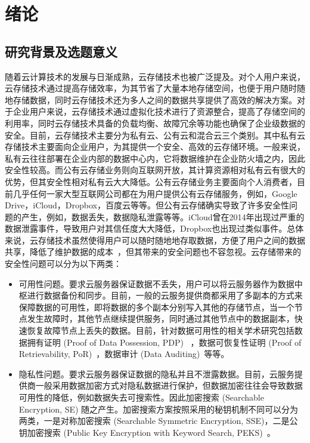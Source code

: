 \chapter{绪论}
\label{cha:intro}
\section{研究背景及选题意义}
随着云计算技术的发展与日渐成熟，云存储技术也被广泛提及。对个人用户来说，云存储技术通过提高存储效率，为其节省了大量本地存储空间，也便于用户随时随地存储数据，同时云存储技术还为多人之间的数据共享提供了高效的解决方案。对于企业用户来说，云存储技术通过虚拟化技术进行了资源整合，提高了存储空间的利用率，同时云存储技术具备的负载均衡、故障冗余等功能也确保了企业级数据的安全。目前，云存储技术主要分为私有云、公有云和混合云三个类别。其中私有云存储技术主要面向企业用户，为其提供一个安全、高效的云存储环境。一般来说，私有云往往部署在企业内部的数据中心内，它将数据维护在企业防火墙之内，因此安全性较高。而公有云存储业务则向互联网开放，其计算资源相对私有云有很大的优势，但其安全性相对私有云大大降低。公有云存储业务主要面向个人消费者，目前几乎任何一家大型互联网公司都在为用户提供公有云存储服务，例如，Google Drive，iCloud，Dropbox，百度云等等。但公有云存储确实导致了许多安全性问题的产生，例如，数据丢失，数据隐私泄露等等。iCloud曾在2014年出现过严重的数据泄露事件，导致用户对其信任度大大降低，Dropbox也出现过类似事件。总体来说，云存储技术虽然使得用户可以随时随地地存取数据，方便了用户之间的数据共享，降低了维护数据的成本~\cite{juels2007pors,ateniese2008scalable,kamara2011cs2,wang2011enabling,stefanov2012iris,kamara2013parallel,sun2015catch}，但其带来的安全问题也不容忽视。云存储带来的安全性问题可以分为以下两类：
\begin{itemize}
	\item 可用性问题。要求云服务器保证数据不丢失，用户可以将云服务器作为数据中枢进行数据备份和同步。目前，一般的云服务提供商都采用了多副本的方式来保障数据的可用性，即将数据的多个副本分别写入其他的存储节点，当一个节点发生故障时，其他节点继续提供服务，同时通过其他节点中的数据副本，快速恢复故障节点上丢失的数据。目前，针对数据可用性的相关学术研究包括数据拥有证明 (Proof of Data Possession, PDP)~\cite{ateniese2007provable, ateniese2008scalable,curtmola2008mr, erway2015dynamic,zhu2012cooperative} ，数据可恢复性证明 (Proof of Retrievability, PoR)~\cite{juels2007pors, bowers2009proofs, stefanov2012iris}，数据审计 (Data Auditing)~\cite{wang2010privacy,wang2010toward,wang2013privacy,wang2011enabling,zhu2011dynamic}等等。
	\item 隐私性问题。要求云服务器保证数据的隐私并且不泄露数据。目前，云服务提供商一般采用数据加密方式对隐私数据进行保护，但数据加密往往会导致数据可用性的降低，例如数据失去可搜索性。因此加密搜索 (Searchable Encryption, SE) 随之产生。加密搜索方案按照采用的秘钥机制不同可以分为两类，一是对称加密搜索 (Searchable Symmetric Encryption, SSE)\cite{song2000practical,curtmola2011searchable,kamara2012dynamic,cash2014dynamic,wang2016searchable}，二是公钥加密搜索 (Public Key Encryption with Keyword Search, PEKS)~\cite{boneh2004public}。
\end{itemize}

